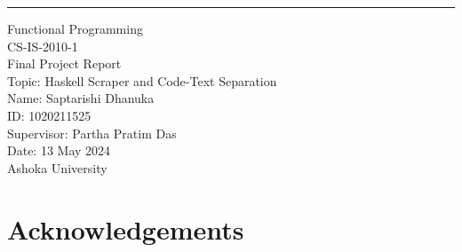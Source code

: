 \documentclass[12pt]{scrreprt}
\begin{document}













\begin{flushright}
    \rule{16cm}{5pt}\vskip1cm
    \begin{bfseries}
        \Huge{Functional Programming \\ CS-IS-2010-1 \\ Final Project Report }\\
        \vspace{1.1cm}
        Topic: Haskell Scraper and Code-Text Separation\\
        \vspace{1.1cm}
        Name: Saptarishi Dhanuka\\
        \vspace{1.1cm}
        ID: 1020211525\\
        \vspace{1.1cm}
        Supervisor: Partha Pratim Das\\
        \vspace{1.1cm}
        Date: 13 May 2024\\
        \vspace{1.1cm}
        Ashoka University\\
    \end{bfseries}
\end{flushright}

\tableofcontents


\chapter{Acknowledgements}
\end{document}
